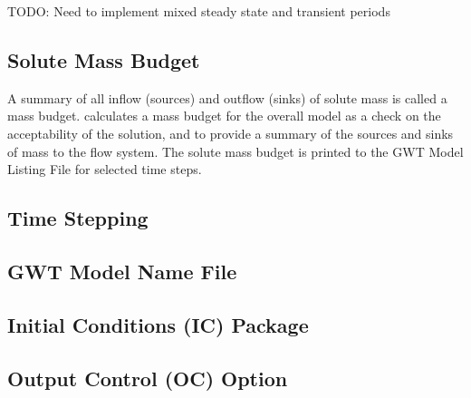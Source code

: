 TODO: Need to implement mixed steady state and transient periods

\subsection{Solute Mass Budget}
A summary of all inflow (sources) and outflow (sinks) of solute mass is called a mass budget.  \mf calculates a mass budget for the overall model as a check on the acceptability of the solution, and to provide a summary of the sources and sinks of mass to the flow system.  The solute mass budget is printed to the GWT Model Listing File for selected time steps.

\subsection{Time Stepping}


\newpage
\subsection{GWT Model Name File}


%

%

%

\newpage
\subsection{Initial Conditions (IC) Package}


\newpage
\subsection{Output Control (OC) Option}


\newpage
